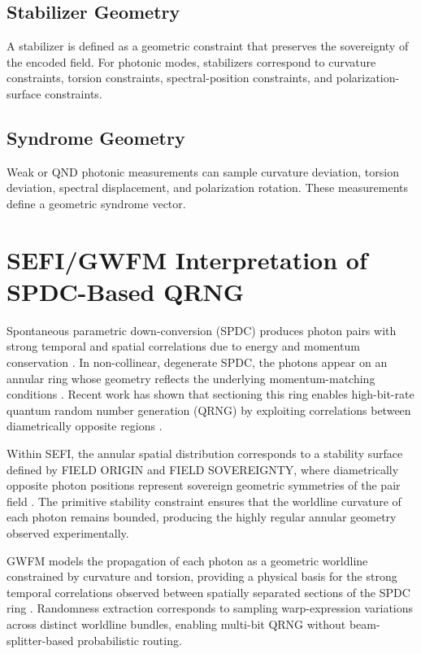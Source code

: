\documentclass[aip, adv, reprint, superscriptaddress]{revtex4-2}
\begin{document}
\subsection{Stabilizer Geometry}

A stabilizer is defined as a geometric constraint that preserves the sovereignty of the 
encoded field. For photonic modes, stabilizers correspond to curvature constraints, 
torsion constraints, spectral-position constraints, and polarization-surface constraints.

\subsection{Syndrome Geometry}

Weak or QND photonic measurements can sample curvature deviation, torsion deviation, 
spectral displacement, and polarization rotation. These measurements define a 
geometric syndrome vector.

\section{SEFI/GWFM Interpretation of SPDC-Based QRNG}

Spontaneous parametric down-conversion (SPDC) produces photon pairs with strong 
temporal and spatial correlations due to energy and momentum conservation 
\cite{HongMandel, Uren2005}. In non-collinear, degenerate SPDC, the photons appear 
on an annular ring whose geometry reflects the underlying momentum-matching 
conditions \cite{Jabir2017}. Recent work has shown that sectioning this ring enables 
high-bit-rate quantum random number generation (QRNG) by exploiting correlations 
between diametrically opposite regions \cite{SPDCQRNG2023}.

Within SEFI, the annular spatial distribution corresponds to a stability surface defined 
by FIELD ORIGIN and FIELD SOVEREIGNTY, where diametrically opposite photon 
positions represent sovereign geometric symmetries of the pair field \cite{DuttonSEFI}. 
The primitive stability constraint ensures that the worldline curvature of each photon 
remains bounded, producing the highly regular annular geometry observed 
experimentally.

GWFM models the propagation of each photon as a geometric worldline constrained by 
curvature and torsion, providing a physical basis for the strong temporal correlations 
observed between spatially separated sections of the SPDC ring \cite{DuttonGWFM}. 
Randomness extraction corresponds to sampling warp-expression variations across 
distinct worldline bundles, enabling multi-bit QRNG without beam-splitter-based 
probabilistic routing.
\end{document}
